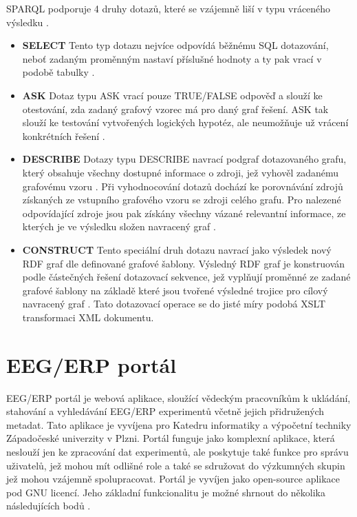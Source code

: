 \documentclass{projekt}
\begin{document}
SPARQL podporuje 4 druhy dotazů, které se vzájemně liší v typu vráceného výsledku \cite{_13}.

\begin {itemize}

\item \textbf{SELECT} Tento typ dotazu nejvíce odpovídá běžnému SQL dotazování, neboť zadaným proměnným nastaví příslušné hodnoty a ty pak vrací v podobě tabulky \cite{_14}.
\item \textbf{ASK} Dotaz typu ASK vrací pouze TRUE/FALSE odpověď a slouží ke otestování, zda zadaný grafový vzorec má pro daný graf řešení. ASK tak slouží ke testování vytvořených logických hypotéz, ale neumožňuje už vrácení konkrétních řešení \cite{_32}.
\item \textbf{DESCRIBE} Dotazy typu DESCRIBE navrací podgraf dotazovaného grafu, který obsahuje všechny dostupné informace o zdroji, jež vyhověl zadanému grafovému vzoru \cite{_13}. Při vyhodnocování dotazů dochází ke porovnávání zdrojů získaných ze vstupního grafového vzoru se zdroji celého grafu. Pro nalezené odpovídající zdroje jsou pak získány všechny vázané relevantní informace, ze kterých je ve výsledku složen navracený graf \cite{_14}.
\item \textbf{CONSTRUCT} Tento speciální druh dotazu navrací jako výsledek nový RDF graf dle definované grafové šablony. Výsledný RDF graf je konstruován podle částečných řešení dotazovací sekvence, jež vyplňují proměnné ze zadané grafové šablony na základě které jsou tvořené výsledné trojice pro cílový navracený graf \cite{_32}. Tato dotazovací operace se do jisté míry podobá XSLT transformaci XML dokumentu.

\end {itemize}

\chapter{EEG/ERP portál}
\hspace{0.65cm}EEG/ERP portál je webová aplikace, sloužící vědeckým pracovníkům k ukládání, stahování a vyhledávání EEG/ERP experimentů včetně jejich přidružených metadat. Tato aplikace je vyvíjena pro Katedru informatiky a výpočetní techniky Západočeské univerzity v Plzni. Portál funguje jako komplexní aplikace, která neslouží jen ke zpracování dat experimentů, ale poskytuje také funkce pro správu uživatelů, jež mohou mít odlišné role a také se sdružovat do výzkumných skupin jež mohou vzájemně spolupracovat. Portál je vyvíjen jako open-source aplikace pod GNU licencí. Jeho základní funkcionalitu je možné shrnout do několika následujících bodů \cite{_15}.
\end{document}
